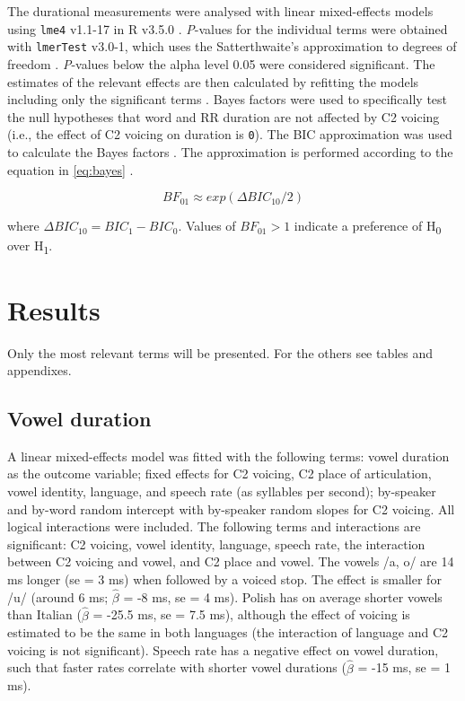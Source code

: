 \documentclass[]{JASAnew}
\begin{document}
The durational measurements were analysed with linear mixed-effects
models using \texttt{lme4} v1.1-17 in R v3.5.0
\citep{r-core-team2018, bates2015}. \emph{P}-values for the individual
terms were obtained with \texttt{lmerTest} v3.0-1, which uses the
Satterthwaite's approximation to degrees of freedom
\citep{kuznetsova2017}. \emph{P}-values below the alpha level 0.05 were
considered significant. The estimates of the relevant effects are then
calculated by refitting the models including only the significant terms
\citep[step-down approach,][]{diggle2002, zuur2009}. Bayes factors were
used to specifically test the null hypotheses that word and RR duration
are not affected by C2 voicing (i.e., the effect of C2 voicing on
duration is \texttt{0}). The BIC approximation was used to calculate the
Bayes factors \citep{wagenmakers2007}. The approximation is performed
according to the equation in \ref{eq:bayes}
\citep[p.~796]{wagenmakers2007}.

\begin{equation}
\label{eq:bayes}
BF_{01} \approx exp(\Delta{}BIC_{10}/2)
\end{equation}

where \(\Delta{}BIC_{10} = BIC_1 - BIC_0\). Values of \(BF_{01} > 1\)
indicate a preference of H\textsubscript{0} over H\textsubscript{1}.

\hypertarget{results}{%
\section{Results}\label{results}}

Only the most relevant terms will be presented. For the others see
tables and appendixes.

\hypertarget{vowel-duration}{%
\subsection{Vowel duration}\label{vowel-duration}}

A linear mixed-effects model was fitted with the following terms: vowel
duration as the outcome variable; fixed effects for C2 voicing, C2 place
of articulation, vowel identity, language, and speech rate (as syllables
per second); by-speaker and by-word random intercept with by-speaker
random slopes for C2 voicing. All logical interactions were included.
The following terms and interactions are significant: C2 voicing, vowel
identity, language, speech rate, the interaction between C2 voicing and
vowel, and C2 place and vowel. The vowels /a, o/ are 14 ms longer (se =
3 ms) when followed by a voiced stop. The effect is smaller for /u/
(around 6 ms; \(\hat{\beta}\) = -8 ms, se = 4 ms). Polish has on average
shorter vowels than Italian (\(\hat{\beta}\) = -25.5 ms, se = 7.5 ms),
although the effect of voicing is estimated to be the same in both
languages (the interaction of language and C2 voicing is not
significant). Speech rate has a negative effect on vowel duration, such
that faster rates correlate with shorter vowel durations
(\(\hat{\beta}\) = -15 ms, se = 1 ms).
\end{document}
